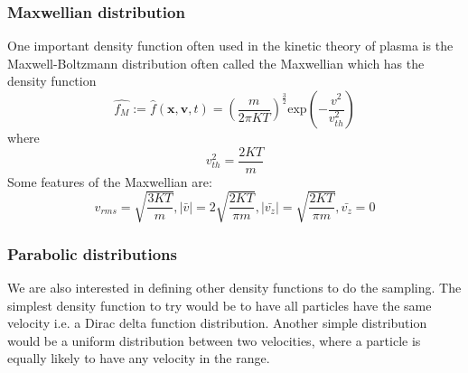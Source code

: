 \documentclass[12pt]{article}
\begin{document}
	\subsubsection{Maxwellian distribution}
	\noindent One important density function often used in the kinetic theory of plasma is the Maxwell-Boltzmann distribution often called the Maxwellian which has the density function 
	\begin{equation}
		\label{eqn:maxwellian}
		\widehat{f_{M}} := \hat{f}(\boldsymbol{x}, \boldsymbol{v}, t) = \left(\frac{m}{2\pi KT}\right)^{\frac{3}{2}} \mathrm{exp}\left(-\frac{v^{2}}{v_{th}^{2}}\right)
	\end{equation} where $$v_{th}^{2} = \frac{2 K T}{m}$$ Some features of the Maxwellian are:
	$$ v_{rms} = \sqrt{\frac{3 K T}{m}} \mathrm{,} |\bar{v}| = 2\sqrt{\frac{2 K T}{\pi m}} \mathrm{,} |\bar{v_{z}}| = \sqrt{\frac{2 K T}{\pi m}} \mathrm{,} \bar{v_{z}} = 0 $$
	
	\subsubsection{Parabolic distributions}
	We are also interested in defining other density functions to do the sampling. The simplest density function to try would be to have all particles have the same velocity i.e. a Dirac delta function distribution. Another simple distribution would be a uniform distribution between two velocities, where a particle is equally likely to have any velocity in the range.
	
\end{document}
